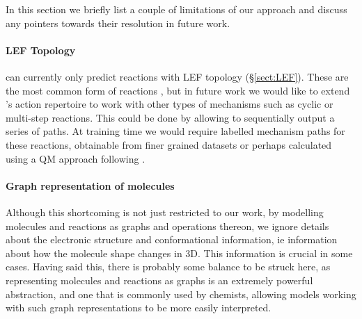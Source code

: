 
In this section we briefly list a couple of limitations of our approach and discuss any pointers towards their resolution in future work.

\paragraph{LEF Topology}

\ourModel can currently only predict reactions with LEF topology (\S \ref{sect:LEF}). 
These are the most common form of reactions \citep{herges1994organizing}, but in future work we would like to extend \ourModel's action repertoire to work with other types of mechanisms such as cyclic or multi-step reactions.
 This could be done by allowing \ourModel to sequentially output a series of paths.
 At training time we would require labelled mechanism paths for these reactions, obtainable from finer grained datasets or perhaps calculated using a QM approach following \citet{Sadowski2016-qg}. 
 
 \paragraph{Graph representation of molecules}

 Although this shortcoming is not just restricted to our work, by modelling molecules and reactions as graphs and operations thereon, we ignore details about the electronic structure and conformational information, ie information about how the molecule shape changes in 3D. 
 This information is crucial in some cases.
 Having said this, there is probably some balance to be struck here, as representing molecules and reactions as graphs is an extremely powerful abstraction, and one that is commonly used by chemists, allowing models working with such graph representations to be more easily interpreted.
 
 
